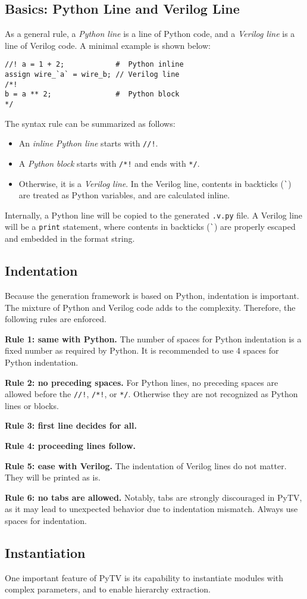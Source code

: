 \subsection{Basics: Python Line and Verilog Line}
As a general rule, a \textit{Python line} is a line of Python code,
and a \textit{Verilog line} is a line of Verilog code.
A minimal example is shown below:

\begin{verbatim}
//! a = 1 + 2;            #  Python inline
assign wire_`a` = wire_b; // Verilog line
/*!
b = a ** 2;               #  Python block
*/
\end{verbatim}

The syntax rule can be summarized as follows:
\begin{itemize}
  \item An \textit{inline Python line} starts with \texttt{//!}.
  \item A \textit{Python block} starts with \texttt{/*!} and ends with \texttt{*/}.
  \item Otherwise, it is a \textit{Verilog line}.
  In the Verilog line, contents in backticks (\verb|`|) are treated as Python variables,
  and are calculated inline.
\end{itemize}

Internally, a Python line will be copied to the generated \texttt{.v.py} file.
A Verilog line will be a \texttt{print} statement,
where contents in backticks (\verb|`|) are properly escaped and embedded in the format string.

\subsection{Indentation}
Because the generation framework is based on Python,
indentation is important.
The mixture of Python and Verilog code adds to the complexity.
Therefore, the following rules are enforced.

\textbf{Rule 1: same with Python.}
The number of spaces for Python indentation is a fixed number as required by Python.
It is recommended to use 4 spaces for Python indentation.

\textbf{Rule 2: no preceding spaces.}
For Python lines, no preceding spaces are allowed before the \texttt{//!}, \texttt{/*!}, or \texttt{*/}.
Otherwise they are not recognized as Python lines or blocks.

\textbf{Rule 3: first line decides for all.}

\textbf{Rule 4: proceeding lines follow.}

\textbf{Rule 5: ease with Verilog.}
The indentation of Verilog lines do not matter.
They will be printed as is.

\textbf{Rule 6: no tabs are allowed.}
Notably, tabs are strongly discouraged in PyTV, as it may lead to unexpected behavior due to indentation mismatch.
Always use spaces for indentation.

\subsection{Instantiation}
One important feature of PyTV is its capability to instantiate modules with complex parameters,
and to enable hierarchy extraction.

